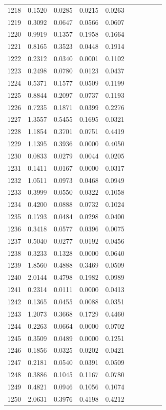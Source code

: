 \begin{table}
\begin{tabular}{cccccccccc}
1218& 0.1520& 0.0285& 0.0215& 0.0263\\ 
1219& 0.3092& 0.0647& 0.0566& 0.0607\\ 
1220& 0.9919& 0.1357& 0.1958& 0.1664\\ 
1221& 0.8165& 0.3523& 0.0448& 0.1914\\ 
1222& 0.2312& 0.0340& 0.0001& 0.1102\\ 
1223& 0.2498& 0.0780& 0.0123& 0.0437\\ 
1224& 0.5371& 0.1577& 0.0509& 0.1199\\ 
1225& 0.8844& 0.2097& 0.0737& 0.1193\\ 
1226& 0.7235& 0.1871& 0.0399& 0.2276\\ 
1227& 1.3557& 0.5455& 0.1695& 0.0321\\ 
1228& 1.1854& 0.3701& 0.0751& 0.4419\\ 
1229& 1.1395& 0.3936& 0.0000& 0.4050\\ 
1230& 0.0833& 0.0279& 0.0044& 0.0205\\ 
1231& 0.1411& 0.0167& 0.0000& 0.0317\\ 
1232& 1.0511& 0.0973& 0.0468& 0.0949\\ 
1233& 0.3999& 0.0550& 0.0322& 0.1058\\ 
1234& 0.4200& 0.0888& 0.0732& 0.1024\\ 
1235& 0.1793& 0.0484& 0.0298& 0.0400\\ 
1236& 0.3418& 0.0577& 0.0396& 0.0075\\ 
1237& 0.5040& 0.0277& 0.0192& 0.0456\\ 
1238& 0.3233& 0.1328& 0.0000& 0.0640\\ 
1239& 1.8560& 0.4888& 0.3469& 0.0509\\ 
1240& 2.0144& 0.4798& 0.1982& 0.0989\\ 
1241& 0.2314& 0.0111& 0.0000& 0.0413\\ 
1242& 0.1365& 0.0455& 0.0088& 0.0351\\ 
1243& 1.2073& 0.3668& 0.1729& 0.4460\\ 
1244& 0.2263& 0.0664& 0.0000& 0.0702\\ 
1245& 0.3509& 0.0489& 0.0000& 0.1251\\ 
1246& 0.1856& 0.0325& 0.0202& 0.0421\\ 
1247& 0.2181& 0.0540& 0.0391& 0.0509\\ 
1248& 0.3886& 0.1045& 0.1167& 0.0780\\ 
1249& 0.4821& 0.0946& 0.1056& 0.1074\\ 
1250& 2.0631& 0.3976& 0.4198& 0.4212\\ 

\end{tabular}
\end{table}
